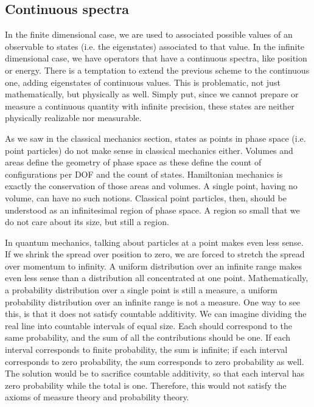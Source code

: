 \subsection{Continuous spectra}

In the finite dimensional case, we are used to associated possible values of an observable to states (i.e. the eigenstates) associated to that value. In the infinite dimensional case, we have operators that have a continuous spectra, like position or energy. There is a temptation to extend the previous scheme to the continuous one, adding eigenstates of continuous values. This is problematic, not just mathematically, but physically as well. Simply put, since we cannot prepare or measure a continuous quantity with infinite precision, these states are neither physically realizable nor measurable.

As we saw in the classical mechanics section, states as points in phase space (i.e. point particles) do not make sense in classical mechanics either. Volumes and areas define the geometry of phase space as these define the count of configurations per DOF and the count of states. Hamiltonian mechanics is exactly the conservation of those areas and volumes. A single point, having no volume, can have no such notions. Classical point particles, then, should be understood as an infinitesimal region of phase space. A region so small that we do not care about its size, but still a region.

In quantum mechanics, talking about particles at a point makes even less sense. If we shrink the spread over position to zero, we are forced to stretch the spread over momentum to infinity. A uniform distribution over an infinite range makes even less sense than a distribution all concentrated at one point. Mathematically, a probability distribution over a single point is still a measure, a uniform probability distribution over an infinite range is not a measure. One way to see this, is that it does not satisfy countable additivity. We can imagine dividing the real line into countable intervals of equal size. Each should correspond to the same probability, and the sum of all the contributions should be one. If each interval corresponds to finite probability, the sum is infinite; if each interval corresponds to zero probability, the sum corresponds to zero probability as well. The solution would be to sacrifice countable additivity, so that each interval has zero probability while the total is one. Therefore, this would not satisfy the axioms of measure theory and probability theory.

